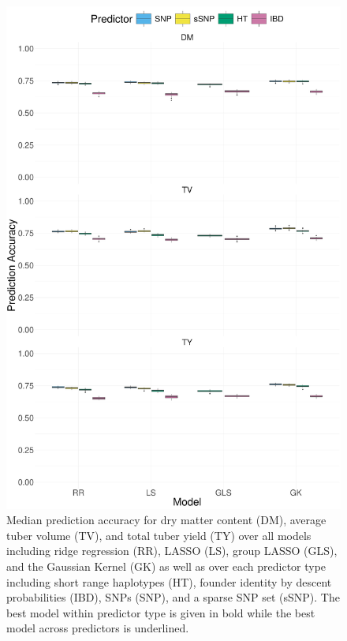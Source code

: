 \begin{figure}

{\centering \includegraphics{./figs_05/fig-pa-1.pdf}

}

\caption{\label{fig-pa}Median prediction accuracy for dry matter content
(DM), average tuber volume (TV), and total tuber yield (TY) over all
models including ridge regression (RR), LASSO (LS), group LASSO (GLS),
and the Gaussian Kernel (GK) as well as over each predictor type
including short range haplotypes (HT), founder identity by descent
probabilities (IBD), SNPs (SNP), and a sparse SNP set (sSNP). The best
model within predictor type is given in bold while the best model across
predictors is underlined.}

\end{figure}

